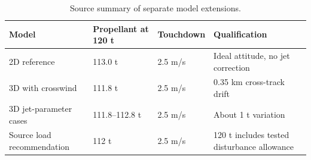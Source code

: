 \begin{table}[htbp]
\caption{Source summary of separate model extensions.}
\label{tab:src13}
\small
\setlength{\tabcolsep}{3.5pt}
\begin{tabularx}{\linewidth}{@{}XXXX@{}}
\toprule
Model & Propellant at 120 t & Touchdown & Qualification \\
\midrule
2D reference & 113.0 t & 2.5 m/s & Ideal attitude, no jet correction \\
3D with crosswind & 111.8 t & 2.5 m/s & 0.35 km cross-track drift \\
3D jet-parameter cases & 111.8--112.8 t & 2.5 m/s & About 1 t variation \\
Source load recommendation & 112 t & 2.5 m/s & 120 t includes tested disturbance allowance \\
\bottomrule
\end{tabularx}
\end{table}
